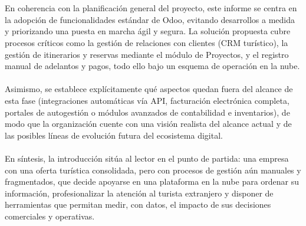 \\
\\
En coherencia con la planificación general del proyecto, este informe se centra en la adopción de funcionalidades estándar de Odoo, evitando desarrollos a medida y priorizando una puesta en marcha ágil y segura. La solución propuesta cubre procesos críticos como la gestión de relaciones con clientes (CRM turístico), la gestión de itinerarios y reservas mediante el módulo de Proyectos, y el registro manual de adelantos y pagos, todo ello bajo un esquema de operación en la nube.
\\
\\
Asimismo, se establece explícitamente qué aspectos quedan fuera del alcance de esta fase (integraciones automáticas vía API, facturación electrónica completa, portales de autogestión o módulos avanzados de contabilidad e inventarios), de modo que la organización cuente con una visión realista del alcance actual y de las posibles líneas de evolución futura del ecosistema digital.
\\
\\
En síntesis, la introducción sitúa al lector en el punto de partida: una empresa con una oferta turística consolidada, pero con procesos de gestión aún manuales y fragmentados, que decide apoyarse en una plataforma en la nube para ordenar su información, profesionalizar la atención al turista extranjero y disponer de herramientas que permitan medir, con datos, el impacto de sus decisiones comerciales y operativas.